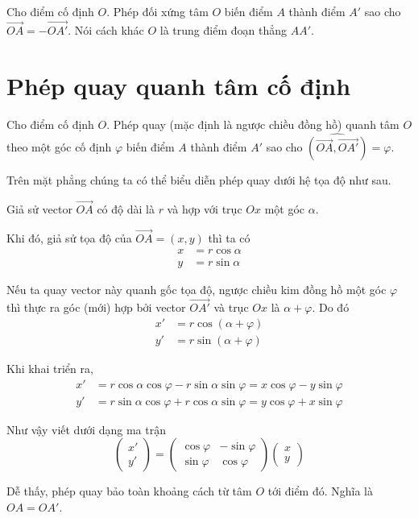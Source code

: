 Cho điểm cố định $O$. Phép đối xứng tâm $O$ biến điểm $A$ thành điểm $A'$ sao
cho $\overrightarrow{OA} = -\overrightarrow{OA'}$. Nói cách khác $O$ là trung điểm
đoạn thẳng $AA'$.

\section{Phép quay quanh tâm cố định}

Cho điểm cố định $O$. Phép quay (mặc định là ngược chiều đồng hồ) quanh tâm $O$
theo một góc cố định $\varphi$ biến điểm $A$ thành điểm $A'$ sao cho
$\widehat{(\overrightarrow{OA}, \overrightarrow{OA'})} = \varphi$.

Trên mặt phẳng chúng ta có thể biểu diễn phép quay dưới hệ tọa độ như sau.

Giả sử vector $\overrightarrow{OA}$ có độ dài là $r$ và hợp với trục $Ox$ một góc $\alpha$.

Khi đó, giả sử tọa độ của $\overrightarrow{OA} = (x, y)$ thì ta có 
\begin{align*}
    x & = r \cos \alpha \\
    y & = r \sin \alpha
\end{align*}

Nếu ta quay vector này quanh gốc tọa độ, ngược chiều kim đồng hồ một góc $\varphi$ thì 
thực ra góc (mới) hợp bởi vector $\overrightarrow{OA'}$ và trục $Ox$ là $\alpha + \varphi$.
Do đó
\begin{align*}
    x' & = r \cos (\alpha + \varphi) \\
    y' & = r \sin (\alpha + \varphi)
\end{align*}

Khi khai triển ra,
\begin{align*}
    x' & = r \cos \alpha \cos \varphi - r \sin \alpha \sin \varphi
= x \cos \varphi - y \sin \varphi \\
    y' & = r \sin \alpha \cos \varphi + r \cos \alpha \sin \varphi 
= y \cos \varphi + x \sin \varphi
\end{align*}

Như vậy viết dưới dạng ma trận
\[\begin{pmatrix}
    x' \\ y'
\end{pmatrix} = \begin{pmatrix}
    \cos \varphi & -\sin \varphi \\
    \sin \varphi & \cos \varphi
\end{pmatrix} \begin{pmatrix}
    x \\ y
\end{pmatrix}\]

Dễ thấy, phép quay bảo toàn khoảng cách từ tâm $O$ tới điểm đó. Nghĩa là $OA = OA'$.